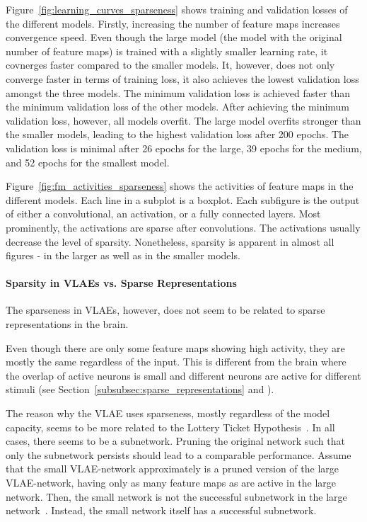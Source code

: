 Figure~\ref{fig:learning_curves_sparseness} shows training and validation losses of the different models.
Firstly, increasing the number of feature maps increases convergence speed.
Even though the large model (the model with the original number of feature maps) is trained with a slightly smaller learning rate, it covnerges faster compared to the smaller models.
It, however, does not only converge faster in terms of training loss, it also achieves the lowest validation loss amongst the three models.
The minimum validation loss is achieved faster than the minimum validation loss of the other models.
After achieving the minimum validation loss, however, all models overfit.
The large model overfits stronger than the smaller models, leading to the highest validation loss after 200 epochs.
The validation loss is minimal after 26 epochs for the large, 39 epochs for the medium, and 52 epochs for the smallest model.

Figure~\ref{fig:fm_activities_sparseness} shows the activities of feature maps in the different models.
Each line in a subplot is a boxplot.
Each subfigure is the output of either a convolutional, an activation, or a fully connected layers.
Most prominently, the activations are sparse after convolutions.
The activations usually decrease the level of sparsity.
Nonetheless, sparsity is apparent in almost all figures - in the larger as well as in the smaller models.

\paragraph{Sparsity in \acp{VLAE} vs. Sparse Representations}
The sparseness in \acp{VLAE}, however, does not seem to be related to sparse representations in the brain.

Even though there are only some feature maps showing high activity, they are mostly the same regardless of the input.
This is different from the brain where the overlap of active neurons is small and different neurons are active for different stimuli (see Section~\ref{subsubsec:sparse_representations} and \citet{yoshida2020natural}).

The reason why the \ac{VLAE} uses sparseness, mostly regardless of the model capacity, seems to be more related to the Lottery Ticket Hypothesis~\citep{frankle2018lottery}.
In all cases, there seems to be a subnetwork.
Pruning the original network such that only the subnetwork persists should lead to a comparable performance.
Assume that the small \ac{VLAE}-network approximately is a pruned version of the large \ac{VLAE}-network, having only as many feature maps as are active in the large network.
Then, the small network is not the successful subnetwork in the large network~\citep{frankle2018lottery}.
Instead, the small network itself has a successful subnetwork.

